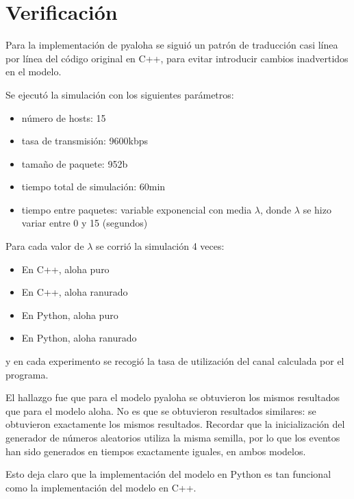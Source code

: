 \section{Verificación}

Para la implementación de pyaloha se siguió un patrón de traducción casi línea
por línea del código original en C++, para evitar introducir cambios
inadvertidos en el modelo.

Se ejecutó la simulación con los siguientes parámetros:

\begin{itemize}
    \item número de hosts: 15

    \item tasa de transmisión: 9600kbps

    \item tamaño de paquete: 952b

    \item tiempo total de simulación: 60min

    \item tiempo entre paquetes: variable exponencial con media $\lambda$,
donde $\lambda$ se hizo variar entre 0 y 15 (segundos)
\end{itemize}

Para cada valor de $\lambda$ se corrió la simulación 4 veces:

\begin{itemize}
    \item En C++, aloha puro
    \item En C++, aloha ranurado
    \item En Python, aloha puro
    \item En Python, aloha ranurado
\end{itemize}

\noindent y en cada experimento se recogió la tasa de utilización del canal
calculada por el programa.

El hallazgo fue que para el modelo pyaloha se obtuvieron los mismos resultados
que para el modelo aloha. No es que se obtuvieron resultados similares: se
obtuvieron exactamente los mismos resultados. Recordar que la inicialización
del generador de números aleatorios utiliza la misma semilla, por lo que los
eventos han sido generados en tiempos exactamente iguales, en ambos modelos.

Esto deja claro que la implementación del modelo en Python es tan funcional
como la implementación del modelo en C++.

